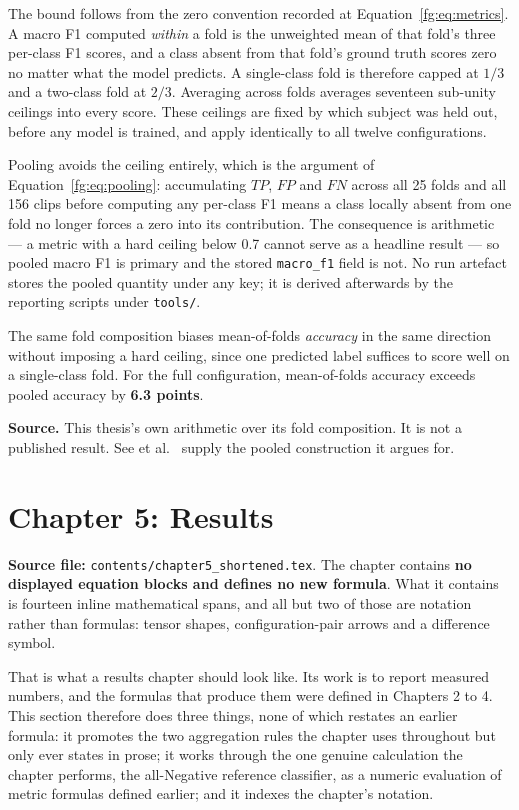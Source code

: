 \documentclass[11pt,a4paper]{article}
\numberwithin{equation}{section}
\begin{document}
The bound follows from the zero convention recorded at
Equation~\eqref{fg:eq:metrics}. A macro F1 computed \emph{within} a fold is
the unweighted mean of that fold's three per-class F1 scores, and a class
absent from that fold's ground truth scores zero no matter what the model
predicts. A single-class fold is therefore capped at $1/3$ and a two-class
fold at $2/3$. Averaging across folds averages seventeen sub-unity ceilings
into every score. These ceilings are fixed by which subject was held out,
before any model is trained, and apply identically to all twelve
configurations.

Pooling avoids the ceiling entirely, which is the argument of
Equation~\eqref{fg:eq:pooling}: accumulating $TP$, $FP$ and $FN$ across all 25
folds and all 156 clips before computing any per-class F1 means a class
locally absent from one fold no longer forces a zero into its contribution.
The consequence is arithmetic --- a metric with a hard ceiling below 0.7
cannot serve as a headline result --- so pooled macro F1 is primary and the
stored \texttt{macro\_f1} field is not. No run artefact stores the pooled
quantity under any key; it is derived afterwards by the reporting scripts
under \texttt{tools/}.

The same fold composition biases mean-of-folds \emph{accuracy} in the same
direction without imposing a hard ceiling, since one predicted label suffices
to score well on a single-class fold. For the full configuration, mean-of-folds
accuracy exceeds pooled accuracy by \textbf{6.3 points}.

\textbf{Source.} This thesis's own arithmetic over its fold composition. It is
not a published result. See et al.~\cite{see2019} supply the pooled
construction it argues for.


\section{Chapter 5: Results}
\label{fg5:chapter5}

\textbf{Source file:} \texttt{contents/chapter5\_shortened.tex}. The chapter
contains \textbf{no displayed equation blocks and defines no new formula}. What
it contains is fourteen inline mathematical spans, and all but two of those are
notation rather than formulas: tensor shapes, configuration-pair arrows and a
difference symbol.

That is what a results chapter should look like. Its work is to report measured
numbers, and the formulas that produce them were defined in Chapters 2 to 4.
This section therefore does three things, none of which restates an earlier
formula: it promotes the two aggregation rules the chapter uses throughout but
only ever states in prose; it works through the one genuine calculation the
chapter performs, the all-Negative reference classifier, as a numeric
evaluation of metric formulas defined earlier; and it indexes the chapter's
notation.
\end{document}
